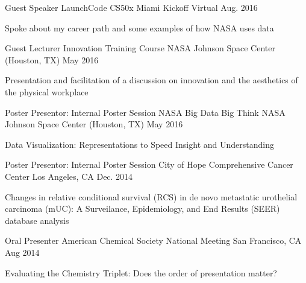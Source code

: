 \begin{cventries}
  \cventry
    {Guest Speaker} %
    {LaunchCode CS50x Miami Kickoff} %
    {Virtual} %
    {Aug. 2016} %
    {
      \begin{cvitems} %
        \item {Spoke about my career path and some examples of how NASA uses data}
      \end{cvitems}
    }    
    

  \cventry
    {Guest Lecturer} %
    {Innovation Training Course} %
    {NASA Johnson Space Center (Houston, TX)} %
    {May 2016} %
    {
      \begin{cvitems} %
        \item {Presentation and facilitation of a discussion on innovation and the aesthetics of the physical workplace}
      \end{cvitems}
    }

  \cventry
    {Poster Presentor: Internal Poster Session} %
    {NASA Big Data Big Think} %
    {NASA Johnson Space Center (Houston, TX)} %
    {May 2016} %
    {
      \begin{cvitems} %
        \item {Data Visualization: Representations to Speed Insight and Understanding}
      \end{cvitems}
    }

  \cventry
    {Poster Presentor: Internal Poster Session} %
    {City of Hope Comprehensive Cancer Center} %
    {Los Angeles, CA} %
    {Dec. 2014} %
    {
      \begin{cvitems} %
        \item {Changes in relative conditional survival (RCS) in de novo metastatic urothelial carcinoma (mUC): A Surveilance, Epidemiology, and End Results (SEER) database analysis}
      \end{cvitems}
    }

  \cventry
    {Oral Presenter} %
    {American Chemical Society National Meeting} %
    {San Francisco, CA} %
    {Aug 2014} %
    {
      \begin{cvitems} %
        \item { Evaluating the Chemistry Triplet: Does the order of presentation matter?}
      \end{cvitems}
    }


\end{cventries}
